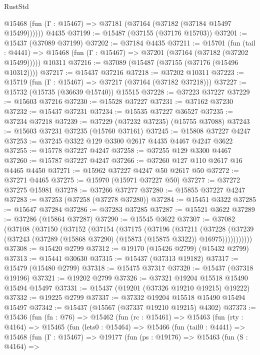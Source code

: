 \begin{lexlean}{RustStd}
\begin{coremodule}
      @15468 (fun (Γ : @15467) => @37181 (@37164 (@37182 (@37184 @15497 @15499))))))
    @4435
@37199 := @15487 (@37155 (@37176 @15703))
@37201 := @15437 (@37089 @37199)
@37202 := @37184 @4435
@37211 := @15701
    (fun (tail : @4441) => @15468 (fun (Γ : @15467) => @37201 (@37164 (@37182 (@37202 @15499)))))
    @10311
@37216 := @37089 (@15487 (@37155 (@37176 (@15496 @10312))))
@37217 := @15437 @37216
@37218 := @37202 @10311
@37223 := @15719 (fun (Γ : @15467) => @37217 (@37164 (@37182 @37218)))
@37227 := @15732 (@15735 (@36639 @15740)) @15515
@37228 := @37223 @37227
@37229 := @15603 @37216
@37230 := @15528 @37227
@37231 := @37162 @37230
@37232 := @15437 @37231
@37234 := @15535 @37227 @36527
@37235 := @37234 @37218
@37239 := @37229 (@37232 @37235) (@15755 @37088)
@37243 := @15603 @37231 @37235 (@15760 @37161)
@37245 := @15808 @37227 @4247
@37253 := @37245 @3322 @129 @3300 @2617 @4435 @4467 @4247 @3622
@37255 := @15778 @37227 @4247
@37258 := @37255 @129 @3300 @4467
@37260 := @15787 @37227 @4247
@37266 := @37260 @127 @110 @2617 @16 @4465 @4450
@37271 := @15962 @37227 @4247 @50 @2617 @50
@37272 := @37271 @4465
@37275 := @15970 (@15971 @37227 @50)
@37277 := @37272 @37275 @15981
@37278 := @37266 @37277
@37280 := @15855 @37227 @4247
@37283 := @37253 (@37258 (@37278 @37280))
@37284 := @15451 @3322
@37285 := @15647 @37284
@37286 := @37283 @37285
@37287 := @15521 @3622
@37289 := @37286 (@15864 @37287)
@37290 := @15545 @3622
@37307 := @37082
    (@37108
      (@37150
        (@37152
          (@37154
            (@37175
              (@37196
                (@37211
                  (@37228
                    (@37239
                      (@37243 (@37289 (@15868 @37290) (@15873 (@15875 @3322)) @16975)))))))))))
@37308 := @15420 @2799
@37312 := @19170 (@15426 @2799) (@15432 @2799)
@37313 := @15441 @30630
@37315 := @15437 (@37313 @19182)
@37317 := @15479 (@15480 @2799)
@37318 := @15475 @37317
@37320 := @15437 (@37318 @19196)
@37321 := @19202 @2799
@37326 := @37321 @19204 @15518 @15490 @15494 @15497
@37331 := @15437 (@19201 (@37326 @19210 @19215) @19222)
@37332 := @19225 @2799
@37337 := @37332 @19204 @15518 @15490 @15494 @15497
@37342 := @15437 (@15567 (@37337 @19210 @19215) @4302)
@37373 := @15436
    (fun (fn : @76) =>
    @15462
      (fun (rc : @15461) =>
      @15463
        (fun (rty : @4164) =>
        @15465
          (fun (lets0 : @15464) =>
          @15466
            (fun (tail0 : @4441) =>
            @15468
              (fun (Γ : @15467) =>
              @19177
                (fun (ps : @19176) =>
                @15463
                  (fun (S : @4164) =>

\end{coremodule}
\end{lexlean}
